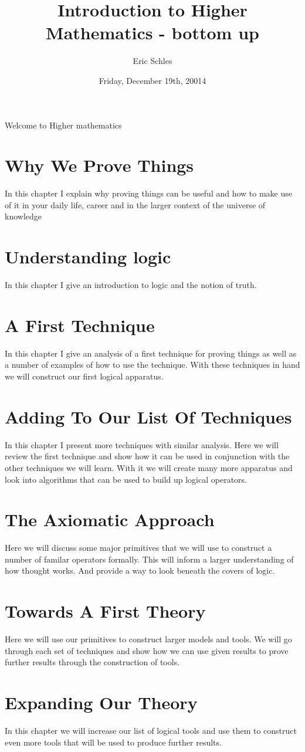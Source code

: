 \documentclass{book}
\title{Introduction to Higher Mathematics - bottom up}
\author{Eric Schles}
\date{ Friday, December 19th, 20014}
\begin{document}
\maketitle
Welcome to Higher mathematics
\tableofcontents
\chapter{Why We Prove Things}
In this chapter I explain why proving things can be useful and how to make use of it in your daily life, career and in the larger context of the universe of knowledge
\chapter{Understanding logic}
 In this chapter I give an introduction to logic and the notion of truth.  
\chapter{A First Technique}
In this chapter I give an analysis of a first technique for proving things as well as a number of examples of how to use the technique.  With these techniques in hand we will construct our first logical apparatus.
\chapter{Adding To Our List Of Techniques}
In this chapter I present more techniques with similar analysis.  Here we will review the first technique and show how it can be used in conjunction with the other techniques we will learn.  With it we will create many more apparatus and look into algorithms that can be used to build up logical operators.
\chapter{The Axiomatic Approach}
Here we will discuss some major primitives that we will use to construct a number of familar operators formally.  This will inform a larger understanding of how thought works. And provide a way to look beneath the covers of logic.
\chapter{Towards A First Theory}
Here we will use our primitives to construct larger models and tools.  We will go through each set of techniques and show how we can use given results to prove further results through the construction of tools.
\chapter{Expanding Our Theory}
In this chapter we will increase our list of logical tools and use them to construct even more tools that will be used to produce further results.
\end{document}
